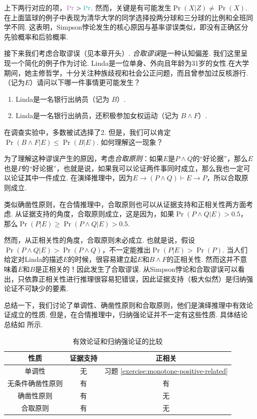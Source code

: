 上下两行对应的项，$\light{\Pr}>\contrastlight{\Pr}$. 然而，关键是有可能发生$\Pr(X|Z) \neq \Pr(X)$. 在上面篮球的例子中表现为清华大学的同学选择投两分球和三分球的比例和全班同学不同. 这表明，Simpson悖论发生的核心原因与基率谬误类似，即没有正确区分先验概率和后验概率.

接下来我们考虑合取谬误（见本章开头）. \textit{合取谬误}是一种认知偏差. 我们这里呈现一个简化的例子作为讨论. Linda是一位单身、外向且年龄为31岁的女性.在大学期间，她主修哲学，十分关注种族歧视和社会公正问题，而且曾参加过反核游行.（记为$E$）请问以下哪一件事情更可能发生？
    \begin{enumerate}
        \item Linda是一名银行出纳员（记为 $B$）.
        \item Linda是一名银行出纳员，还积极参加女权运动（记为 $B\wedge F$）.
    \end{enumerate}
在调查实验中，多数被试选择了2. 但是，我们可以肯定 $\Pr(B \land F|E) \leq \Pr(B|E)$. 如何理解这一现象？

为了理解这种谬误产生的原因，考虑\textit{合取原则}：如果$E$是$P\wedge Q$的“好论据”，那么$E$也是$P$的“好论据”，也就是说，如果我可以论证两件事同时成立，那么我也一定可以论证其中一件成立. 在演绎推理中，因为$E\to(P\wedge Q)\vdash E\to P$，所以合取原则成立. 

类似确凿性原则，在合情推理中，合取原则也可以从证据支持和正相关性两方面考虑. 从证据支持的角度，合取原则成立，这是因为，如果$\Pr(P\wedge Q|E)>0.5$，那么$\Pr(P|E)\geq \Pr(P\wedge Q|E)>0.5$.

然而，从正相关性的角度，合取原则未必成立. 也就是说，假设$\Pr(P\wedge Q|E)>\Pr(P\wedge Q)$，不一定能推出$\Pr(P|E)>\Pr(P)$. 当人们给定对Linda的描述$E$的时候，很容易建立起$E$和$B\wedge F$的正相关性. 然而这并不意味着$E$和$B$是正相关的！因此发生了合取谬误. 从Simpson悖论和合取谬误可以看出，只依靠正相关性进行推理很容易犯错误，因此证据支持（极大似然）是归纳强论证不可缺少的要素.

总结一下，我们讨论了单调性、确凿性原则和合取原则，他们是演绎推理中有效论证成立的性质. 但是，在合情推理中，归纳强论证并不一定有这些性质. 具体结论总结如 所示.

\begin{table}[htbp]
    \centering
    \begin{tabular}{c|c|c}
        \toprule
        性质 & 证据支持 & 正相关 \\ \midrule
        单调性 & 无 & 习题 \ref{exercise:monotone-positive-related} \\
        无条件确凿性原则 & 有 & 有 \\
        确凿性原则 & 有 & 无 \\
        合取原则 & 有 & 无 \\
        \bottomrule
    \end{tabular}
    \caption{有效论证和归纳强论证的比较}
    \label{tab:reasoning-comparison}
\end{table}

